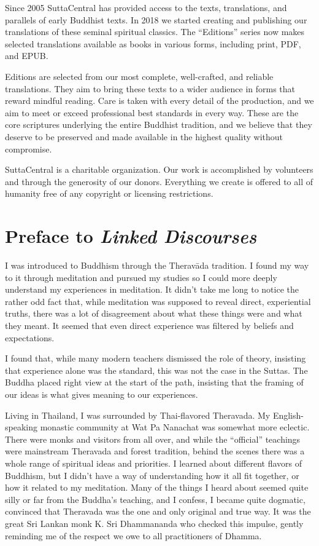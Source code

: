 \documentclass[12pt,openany]{book}%
\begin{document}
Since 2005 SuttaCentral has provided access to the texts, translations, and parallels of early Buddhist texts. In 2018 we started creating and publishing our translations of these seminal spiritual classics. The “Editions” series now makes selected translations available as books in various forms, including print, PDF, and EPUB.

Editions are selected from our most complete, well-crafted, and reliable translations. They aim to bring these texts to a wider audience in forms that reward mindful reading. Care is taken with every detail of the production, and we aim to meet or exceed professional best standards in every way. These are the core scriptures underlying the entire Buddhist tradition, and we believe that they deserve to be preserved and made available in the highest quality without compromise.

SuttaCentral is a charitable organization. Our work is accomplished by volunteers and through the generosity of our donors. Everything we create is offered to all of humanity free of any copyright or licensing restrictions. 

%
\chapter*{Preface to \emph{Linked Discourses}}

I was introduced to Buddhism through the \textsanskrit{Theravāda} tradition. I found my way to it through meditation and pursued my studies so I could more deeply understand my experiences in meditation. It didn’t take me long to notice the rather odd fact that, while meditation was supposed to reveal direct, experiential truths, there was a lot of disagreement about what these things were and what they meant. It seemed that even direct experience was filtered by beliefs and expectations. 

I found that, while many modern teachers dismissed the role of theory, insisting that experience alone was the standard, this was not the case in the Suttas. The Buddha placed right view at the start of the path, insisting that the framing of our ideas is what gives meaning to our experiences.

Living in Thailand, I was surrounded by Thai-flavored Theravada. My English-speaking monastic community at Wat Pa Nanachat was somewhat more eclectic. There were monks and visitors from all over, and while the “official” teachings were mainstream Theravada and forest tradition, behind the scenes there was a whole range of spiritual ideas and priorities. I learned about different flavors of Buddhism, but I didn’t have a way of understanding how it all fit together, or how it related to my meditation. Many of the things I heard about seemed quite silly or far from the Buddha’s teaching, and I confess, I became quite dogmatic, convinced that Theravada was the one and only original and true way. It was the great Sri Lankan monk K. Sri Dhammananda who checked this impulse, gently reminding me of the respect we owe to all practitioners of Dhamma.
\end{document}

